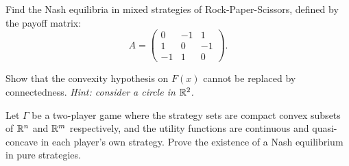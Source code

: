 \begin{exercise}
Find the Nash equilibria in mixed strategies of Rock-Paper-Scissors, defined by the
payoff matrix:
\[
  A = \begin{pmatrix} 0 & -1 & 1 \\ 1 & 0 & -1 \\ -1 & 1 & 0 \end{pmatrix}.
\]
\end{exercise}

\begin{exercise}
Show that the convexity hypothesis on $F(x)$ cannot be replaced by connectedness.
\emph{Hint: consider a circle in $\mathbb{R}^2$.}
\end{exercise}

\begin{exercise}
Let $\Gamma$ be a two-player game where the strategy sets are compact convex subsets of
$\mathbb{R}^n$ and $\mathbb{R}^m$ respectively, and the utility functions are continuous and quasi-concave
in each player's own strategy. Prove the existence of a Nash equilibrium in pure strategies.
\end{exercise}
